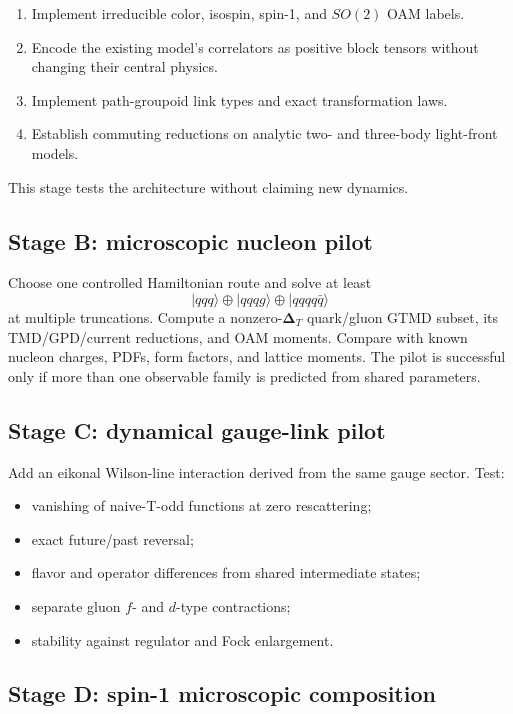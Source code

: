 \documentclass[11pt]{article}
\newcommand{\DT}{\bm{\Delta}_{T}}
\begin{document}
\begin{enumerate}
\item Implement irreducible color, isospin, spin-1, and \(SO(2)\) OAM labels.
\item Encode the existing model's correlators as positive block tensors
without changing their central physics.
\item Implement path-groupoid link types and exact transformation laws.
\item Establish commuting reductions on analytic two- and three-body
light-front models.
\end{enumerate}
This stage tests the architecture without claiming new dynamics.

\subsection{Stage B: microscopic nucleon pilot}

Choose one controlled Hamiltonian route and solve at least
\[
|qqq\rangle\oplus|qqqg\rangle\oplus|qqqq\bar q\rangle
\]
at multiple truncations.  Compute a nonzero-\(\DT\) quark/gluon GTMD subset,
its TMD/GPD/current reductions, and OAM moments.  Compare with known nucleon
charges, PDFs, form factors, and lattice moments.  The pilot is successful
only if more than one observable family is predicted from shared
parameters.

\subsection{Stage C: dynamical gauge-link pilot}

Add an eikonal Wilson-line interaction derived from the same gauge sector.
Test:
\begin{itemize}
\item vanishing of naive-T-odd functions at zero rescattering;
\item exact future/past reversal;
\item flavor and operator differences from shared intermediate states;
\item separate gluon \(f\)- and \(d\)-type contractions;
\item stability against regulator and Fock enlargement.
\end{itemize}

\subsection{Stage D: spin-1 microscopic composition}
\end{document}
